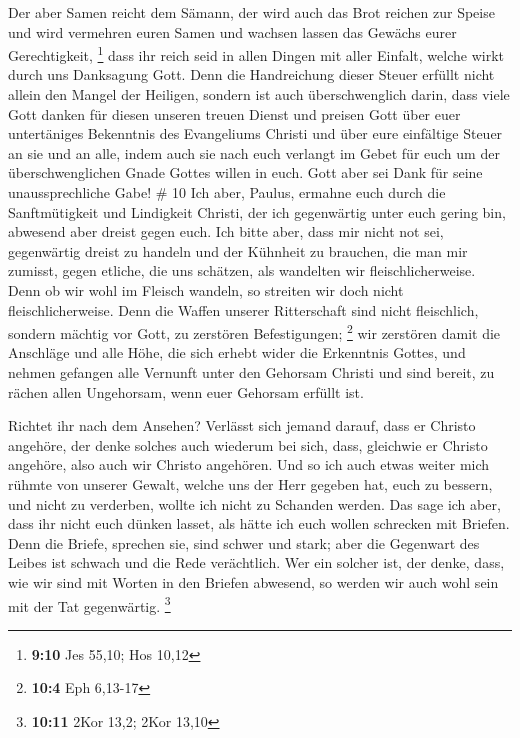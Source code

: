  Der aber Samen reicht dem Sämann, der wird auch das Brot
reichen zur Speise und wird vermehren euren Samen und wachsen lassen das
Gewächs eurer Gerechtigkeit, \footnote{\textbf{9:10} Jes 55,10; Hos
  10,12}  dass ihr reich seid in allen Dingen mit aller
Einfalt, welche wirkt durch uns Danksagung Gott.  Denn die
Handreichung dieser Steuer erfüllt nicht allein den Mangel der Heiligen,
sondern ist auch überschwenglich darin, dass viele Gott danken für
diesen unseren treuen Dienst  und preisen Gott über euer
untertäniges Bekenntnis des Evangeliums Christi und über eure einfältige
Steuer an sie und an alle,  indem auch sie nach euch
verlangt im Gebet für euch um der überschwenglichen Gnade Gottes willen
in euch.  Gott aber sei Dank für seine unaussprechliche
Gabe! \# 10  Ich aber, Paulus, ermahne euch durch die
Sanftmütigkeit und Lindigkeit Christi, der ich gegenwärtig unter euch
gering bin, abwesend aber dreist gegen euch.  Ich bitte
aber, dass mir nicht not sei, gegenwärtig dreist zu handeln und der
Kühnheit zu brauchen, die man mir zumisst, gegen etliche, die uns
schätzen, als wandelten wir fleischlicherweise.  Denn ob wir
wohl im Fleisch wandeln, so streiten wir doch nicht fleischlicherweise.
 Denn die Waffen unserer Ritterschaft sind nicht
fleischlich, sondern mächtig vor Gott, zu zerstören Befestigungen;
\footnote{\textbf{10:4} Eph 6,13-17}  wir zerstören damit
die Anschläge und alle Höhe, die sich erhebt wider die Erkenntnis
Gottes, und nehmen gefangen alle Vernunft unter den Gehorsam Christi
 und sind bereit, zu rächen allen Ungehorsam, wenn euer
Gehorsam erfüllt ist.

 Richtet ihr nach dem Ansehen? Verlässt sich jemand darauf,
dass er Christo angehöre, der denke solches auch wiederum bei sich,
dass, gleichwie er Christo angehöre, also auch wir Christo angehören.
 Und so ich auch etwas weiter mich rühmte von unserer
Gewalt, welche uns der Herr gegeben hat, euch zu bessern, und nicht zu
verderben, wollte ich nicht zu Schanden werden.  Das sage
ich aber, dass ihr nicht euch dünken lasset, als hätte ich euch wollen
schrecken mit Briefen.  Denn die Briefe, sprechen sie, sind
schwer und stark; aber die Gegenwart des Leibes ist schwach und die Rede
verächtlich.  Wer ein solcher ist, der denke, dass, wie wir
sind mit Worten in den Briefen abwesend, so werden wir auch wohl sein
mit der Tat gegenwärtig. \footnote{\textbf{10:11} 2Kor 13,2; 2Kor 13,10}

